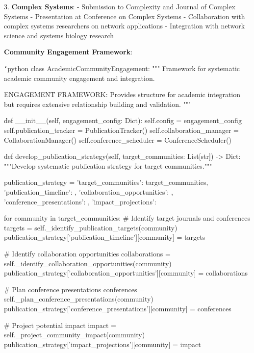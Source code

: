 3. \textbf{Complex Systems}:
   - Submission to Complexity and Journal of Complex Systems
   - Presentation at Conference on Complex Systems
   - Collaboration with complex systems researchers on network applications
   - Integration with network science and systems biology research

\textbf{Community Engagement Framework}:

\texttt{`}python
class AcademicCommunityEngagement:
    """
    Framework for systematic academic community engagement and integration.
    
    ENGAGEMENT FRAMEWORK: Provides structure for academic integration
    but requires extensive relationship building and validation.
    """
    
    def __init__(self, engagement_config: Dict):
        self.config = engagement_config
        self.publication_tracker = PublicationTracker()
        self.collaboration_manager = CollaborationManager()
        self.conference_scheduler = ConferenceScheduler()
        
    def develop_publication_strategy(self, target_communities: List[str]) -> Dict:
        """Develop systematic publication strategy for target communities."""
        
        publication_strategy = {
            'target_communities': target_communities,
            'publication_timeline': {},
            'collaboration_opportunities': {},
            'conference_presentations': {},
            'impact_projections': {}
        }
        
        for community in target_communities:
            \# Identify target journals and conferences
            targets = self._identify_publication_targets(community)
            publication_strategy['publication_timeline'][community] = targets
            
            \# Identify collaboration opportunities
            collaborations = self._identify_collaboration_opportunities(community)
            publication_strategy['collaboration_opportunities'][community] = collaborations
            
            \# Plan conference presentations
            conferences = self._plan_conference_presentations(community)
            publication_strategy['conference_presentations'][community] = conferences
            
            \# Project potential impact
            impact = self._project_community_impact(community)
            publication_strategy['impact_projections'][community] = impact
        
